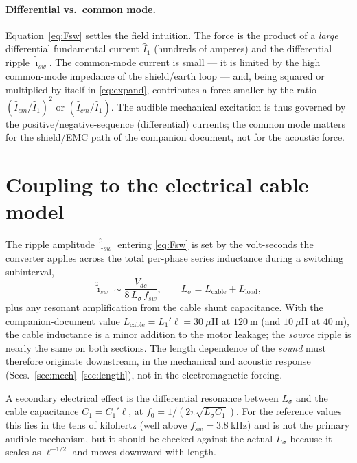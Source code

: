 \documentclass[11pt,a4paper,oneside]{book}
\begin{document}
\begin{onehalfspace}
\begin{appendices}
\paragraph{Differential vs.\ common mode.}
Equation~\eqref{eq:Fsw} settles the field intuition. The force is the product of a
\emph{large} differential fundamental current $\hat I_1$ (hundreds of amperes) and
the differential ripple $\hat{\tilde\imath}_{sw}$. The common-mode current is
small --- it is limited by the high common-mode impedance of the shield/earth loop
--- and, being squared or multiplied by itself in \eqref{eq:expand}, contributes a
force smaller by the ratio $(\hat I_{cm}/\hat I_1)^2$ or $(\hat I_{cm}/\hat I_1)$.
The audible mechanical excitation is thus governed by the positive/negative-sequence
(differential) currents; the common mode matters for the shield/EMC path of the
companion document, not for the acoustic force.

\section{Coupling to the electrical cable model}
The ripple amplitude $\hat{\tilde\imath}_{sw}$ entering \eqref{eq:Fsw} is set by the
volt-seconds the converter applies across the total per-phase series inductance
during a switching subinterval,
\begin{equation}
	\hat{\tilde\imath}_{sw}\sim\frac{V_{dc}}{8\,L_\sigma\,f_{sw}},
	\qquad L_\sigma=L_{\text{cable}}+L_{\text{load}},
	\label{eq:ripple}
\end{equation}
plus any resonant amplification from the cable shunt capacitance. With the
companion-document value $L_{\text{cable}}=L_1'\ell=30\ \mu\mathrm{H}$ at
$120\ \mathrm{m}$ (and $10\ \mu\mathrm{H}$ at $40\ \mathrm{m}$), the cable
inductance is a minor addition to the motor leakage; the \emph{source} ripple is
nearly the same on both sections. The length dependence of the \emph{sound} must
therefore originate downstream, in the mechanical and acoustic response
(Secs.~\ref{sec:mech}--\ref{sec:length}), not in the electromagnetic forcing.

A secondary electrical effect is the differential resonance between $L_\sigma$ and
the cable capacitance $C_1=C_1'\ell$, at
$f_{0}=1/(2\pi\sqrt{L_\sigma C_1})$. For the reference values this lies in the tens
of kilohertz (well above $f_{sw}=3.8\ \mathrm{kHz}$) and is not the primary audible
mechanism, but it should be checked against the actual $L_\sigma$ because it scales
as $\ell^{-1/2}$ and moves downward with length.


\end{appendices}
\end{onehalfspace}
\end{document}
